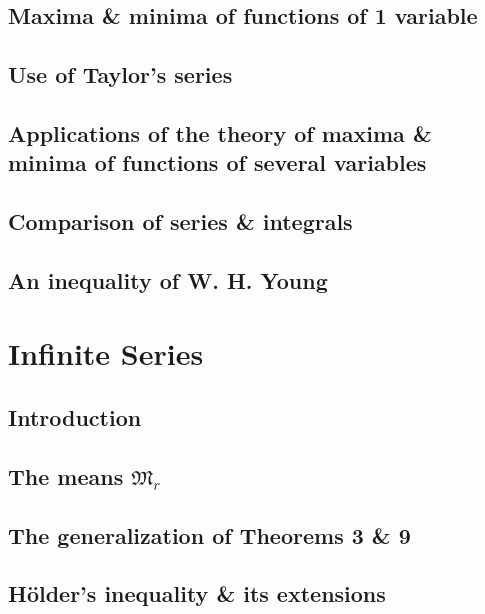 \documentclass[oneside]{book}
\numberwithin{equation}{section}
\begin{document}
\subsection{Maxima \& minima of functions of 1 variable}

\subsection{Use of Taylor's series}

\subsection{Applications of the theory of maxima \& minima of functions of several variables}

\subsection{Comparison of series \& integrals}

\subsection{An inequality of W. H. Young}


\section{Infinite Series}

\subsection{Introduction}

\subsection{The means $\mathfrak{M}_r$}

\subsection{The generalization of Theorems 3 \& 9}

\subsection{H\"older's inequality \& its extensions}
\end{document}
